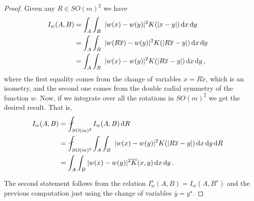 \begin{proof}
Given any $R\in SO(m)^2$ we have
\begin{align*}
	I_w(A,B) &= \int_A  \int_B  \ |w(x)-w(y)|^2 K(|x-y|)  \,\mathrm{d} x \,\mathrm{d} y\\
    &=  \int_A  \int_B  \ |w(R\overline{x})-w(y)|^2 K(|R\overline{x}-y|)  \,\mathrm{d} x \,\mathrm{d} y\\
    &=  \int_A  \int_B  \ |w(x)-w(y)|^2 K(|R\overline{x}-y|)  \,\mathrm{d} x \,\mathrm{d} y\,,
\end{align*}
where the first equality comes from the change of variables $x = R\tilde{x}$, which is an isometry, and the second one comes from the double radial symmetry of the function $w$. Now, if we integrate over all the rotations in $SO(m)^2$ we get the desired result. That is,
\begin{align*}
	I_w(A,B) &=\average_{SO(m)^2} I_w(A,B) \d R \\
    &= \fint_{SO(m)^2} \int_A  \int_B  \ |w(x)-w(y)|^2 K(|R\overline{x}-y|)  \d x \d y \d R \\
    &= \int_A \int_B |w(x)-w(y)|^2 \overline{K}(x,y) \d x \d y\,.
\end{align*}

The second statement follows from the relation $I^\star_w(A,B) = I_w(A,B^\star)$ and the previous computation just using the change of variables $\bar{y} = y^\star$.


\end{proof}
